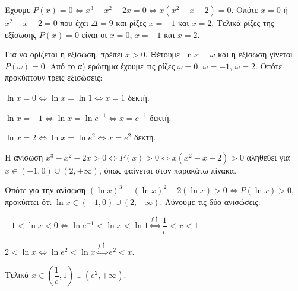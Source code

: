 \begin{alist}
\item Έχουμε $P(x) = 0 \Leftrightarrow x^3 - x^2 - 2x = 0 \Leftrightarrow x(x^2 - x - 2) = 0$. Οπότε $x = 0$ ή $x^2 - x - 2 = 0$ που έχει $\varDelta = 9$ και ρίζες $x = -1$ και $x = 2$. Τελικά ρίζες της εξίσωσης $P(x) = 0$ είναι οι $x = 0$, $x = -1$ και $x = 2$.
\item Για να ορίζεται η εξίσωση, πρέπει $x > 0$. Θέτουμε $\ln x = \omega$ και η εξίσωση γίνεται $P(\omega) = 0$.
Από το α) ερώτημα έχουμε τις ρίζες $\omega = 0$, $\omega = -1$, $\omega = 2$. Οπότε προκύπτουν τρεις εξισώσεις:
\begin{rlist}
\item $\ln x = 0 \Leftrightarrow \ln x = \ln 1 \Leftrightarrow x = 1$ δεκτή.
\item $\ln x = -1 \Leftrightarrow \ln x = \ln e^{-1} \Leftrightarrow x = e^{-1}$ δεκτή.
\item $\ln x = 2 \Leftrightarrow \ln x = \ln e^2 \Leftrightarrow x = e^2$ δεκτή.
\end{rlist}
\item Η ανίσωση $x^3 - x^2 - 2x > 0 \Leftrightarrow P(x) > 0 \Leftrightarrow x(x^2 - x - 2) > 0$ αληθεύει για $x \in (-1, 0) \cup (2, +\infty)$, όπως φαίνεται στον παρακάτω πίνακα.
\begin{center}
\end{center}
Οπότε για την ανίσωση $(\ln x)^3 - (\ln x)^2 - 2(\ln x) > 0 \Leftrightarrow P(\ln x) > 0$, προκύπτει ότι $\ln x \in (-1, 0) \cup (2, +\infty)$. Λύνουμε τις δύο ανισώσεις:
\begin{rlist}
\item $-1 < \ln x < 0 \Leftrightarrow \ln e^{-1} < \ln x < \ln 1 \overset{f\uparrow}{\iff} \dfrac{1}{e} < x < 1$
\item $2 < \ln x \Leftrightarrow \ln e^2 < \ln x \overset{f\uparrow}{\iff} e^2 < x$.
\end{rlist}
Τελικά $x \in \left(\dfrac{1}{e}, 1\right) \cup (e^2, +\infty)$.
\end{alist}

